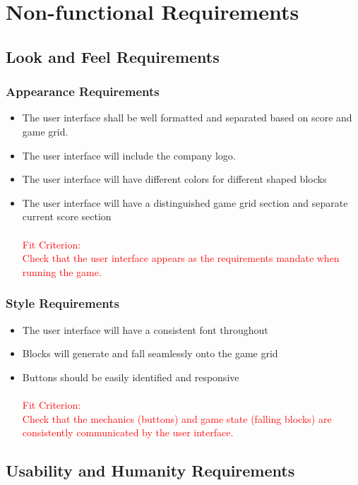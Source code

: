 \documentclass[12pt, titlepage]{article}
\begin{document}
    



\section{Non-functional Requirements}

\subsection{Look and Feel Requirements}
\subsubsection{Appearance Requirements}
\begin{itemize}
\item The user interface shall be well formatted and separated based on score and game grid.
\item The user interface will include the company logo.
\item The user interface will have different colors for different shaped blocks
\item The user interface will have a distinguished game grid section and separate current score section
\\
\\
\textcolor{red}{Fit Criterion:} \\
\textcolor{red}{Check that the user interface appears as the requirements mandate when running the game.}
\end{itemize}
\subsubsection{Style Requirements}
\begin{itemize}
    \item The user interface will have a consistent font throughout
    \item Blocks will generate and fall seamlessly onto the game grid
    \item Buttons should be easily identified and responsive 
    \\
    \\
    \textcolor{red}{Fit Criterion:} \\
    \textcolor{red}{Check that the mechanics (buttons) and game state (falling blocks) are consistently communicated by the user interface.}
\end{itemize}

\subsection{Usability and Humanity Requirements}
\end{document}
